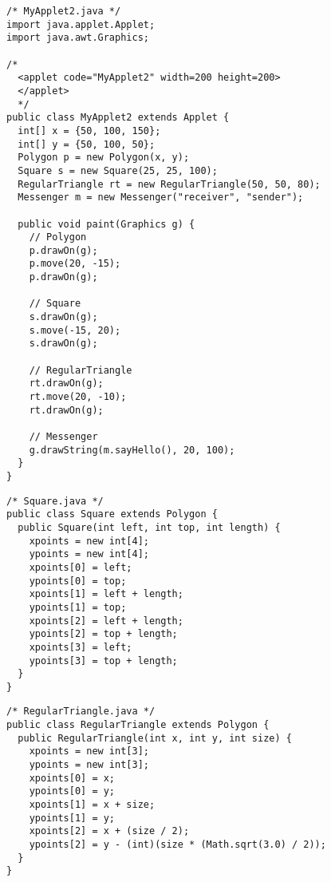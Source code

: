 \documentclass[12pt]{jarticle}
\begin{document}
\begin{verbatim}
/* MyApplet2.java */
import java.applet.Applet;
import java.awt.Graphics;

/*
  <applet code="MyApplet2" width=200 height=200>
  </applet>
  */
public class MyApplet2 extends Applet {
  int[] x = {50, 100, 150};
  int[] y = {50, 100, 50};
  Polygon p = new Polygon(x, y);
  Square s = new Square(25, 25, 100);
  RegularTriangle rt = new RegularTriangle(50, 50, 80);
  Messenger m = new Messenger("receiver", "sender");
  
  public void paint(Graphics g) {
    // Polygon
    p.drawOn(g);
    p.move(20, -15);
    p.drawOn(g);

    // Square
    s.drawOn(g);
    s.move(-15, 20);
    s.drawOn(g);

    // RegularTriangle
    rt.drawOn(g);
    rt.move(20, -10);
    rt.drawOn(g);

    // Messenger
    g.drawString(m.sayHello(), 20, 100);
  }
}
\end{verbatim}
\newpage
\begin{verbatim}
/* Square.java */
public class Square extends Polygon {
  public Square(int left, int top, int length) {
    xpoints = new int[4];
    ypoints = new int[4];
    xpoints[0] = left;
    ypoints[0] = top;
    xpoints[1] = left + length;
    ypoints[1] = top;
    xpoints[2] = left + length;
    ypoints[2] = top + length;
    xpoints[3] = left;
    ypoints[3] = top + length;
  }
}
\end{verbatim}
\begin{verbatim}
/* RegularTriangle.java */
public class RegularTriangle extends Polygon {
  public RegularTriangle(int x, int y, int size) {
    xpoints = new int[3];
    ypoints = new int[3];
    xpoints[0] = x;
    ypoints[0] = y;
    xpoints[1] = x + size;
    ypoints[1] = y;
    xpoints[2] = x + (size / 2);
    ypoints[2] = y - (int)(size * (Math.sqrt(3.0) / 2));
  }
}
\end{verbatim}
\end{document}

